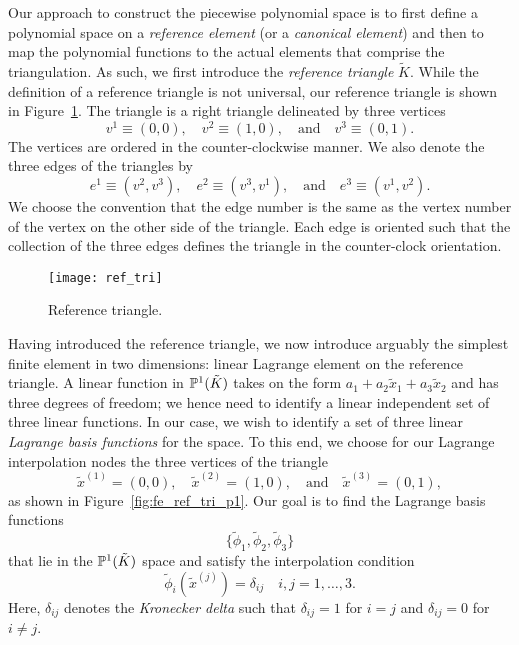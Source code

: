 Our approach to construct the piecewise polynomial space is to first define a polynomial space on a \emph{reference element} (or a \emph{canonical element}) and then to map the polynomial functions to the actual elements that comprise the triangulation.  As such, we first introduce the \emph{reference triangle} $\tilde K$.  While the definition of a reference triangle is not universal, our reference triangle is shown in Figure~\ref{fig:fe_ref_tri}.  The triangle is a right triangle delineated by three vertices
\begin{equation*}
  v^1 \equiv (0,0), \quad v^2 \equiv (1,0), \quad \text{and} \quad v^3 \equiv (0,1).
\end{equation*}
The vertices are ordered in the counter-clockwise manner. We also denote the three edges of the triangles by
\begin{equation*}
  e^1 \equiv (v^2,v^3), \quad e^2 \equiv (v^3,v^1), \quad \text{and} \quad e^3 \equiv (v^1,v^2).
\end{equation*}
We choose the convention that the edge number is the same as the vertex number of the vertex on the other side of the triangle. Each edge is oriented such that the collection of the three edges defines the triangle in the counter-clock orientation.  

\begin{figure}
  \centering
  \texttt{[image: ref\_tri]}
  \caption{Reference triangle.}
  \label{fig:fe_ref_tri}
\end{figure}

Having introduced the reference triangle, we now introduce arguably the simplest finite element in two dimensions: linear Lagrange element on the reference triangle. A linear function in $\mathbb{P}^1(\tilde K)$ takes on the form $a_1 + a_2 \tilde x_1 + a_3 \tilde x_2$ and has three degrees of freedom; we hence need to identify a linear independent set of three linear functions.  In our case, we wish to identify a set of three linear \emph{Lagrange basis functions} for the space.  To this end, we choose for our Lagrange interpolation nodes the three vertices of the triangle
\begin{equation*}
  \tilde x^{(1)} = (0,0), \quad \tilde x^{(2)} = (1,0), \quad \text{and} \quad \tilde x^{(3)} = (0,1),
\end{equation*}
as shown in Figure~\ref{fig:fe_ref_tri_p1}. Our goal is to find the Lagrange basis functions
\begin{equation*}
  \{ \tilde \phi_1, \tilde \phi_2, \tilde \phi_3 \}
\end{equation*}
that lie in the $\mathbb{P}^1(\tilde K)$ space and satisfy the interpolation condition
\begin{equation}
  \tilde \phi_i(\tilde x^{(j)}) = \delta_{ij} \quad i,j = 1,\dots,3.
   \label{eq:fe_interp_tri}
\end{equation}
Here, $\delta_{ij}$ denotes the \emph{Kronecker delta} such that $\delta_{ij} = 1$ for $i = j$ and $\delta_{ij} = 0$ for $i \neq j$.

